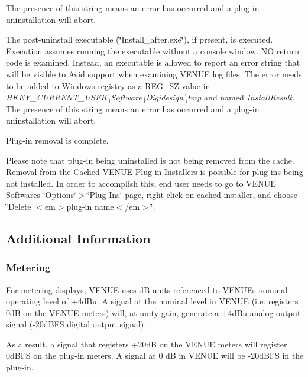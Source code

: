 \begin{DoxyEnumerate}
The presence of this string means an error has occurred and a plug-\/in uninstallation will abort.  
\item The post-\/uninstall executable (\char`\"{}\+Install\+\_\+after.\+exe\char`\"{}), if present, is executed. Execution assumes running the executable without a console window. NO return code is examined. Instead, an executable is allowed to report an error string that will be visible to Avid support when examining V\+E\+N\+UE log files. The error needs to be added to Windows registry as a {\ttfamily R\+E\+G\+\_\+\+SZ} value in {\itshape H\+K\+E\+Y\+\_\+\+C\+U\+R\+R\+E\+N\+T\+\_\+\+U\+S\+ER\textbackslash{}Software\textbackslash{}Digidesign\textbackslash{}tmp} and named {\itshape Install\+Result}. The presence of this string means an error has occurred and a plug-\/in uninstallation will abort.  
\item Plug-\/in removal is complete.  
\end{DoxyEnumerate}

Please note that plug-\/in being uninstalled is not being removed from the cache. Removal from the Cached V\+E\+N\+UE Plug-\/in Installers is possible for plug-\/ins being not installed. In order to accomplish this, end user needs to go to V\+E\+N\+UE Software\textquotesingle{}s \char`\"{}\+Options\char`\"{}$>$\char`\"{}\+Plug-\/\+Ins\char`\"{} page, right click on cached installer, and choose \char`\"{}\+Delete $<$em$>$plug-\/in name$<$/em$>$\char`\"{}.



 \hypertarget{a00849_aax_venue_guide__additional_information}{}\subsection{Additional Information}\label{a00849_aax_venue_guide__additional_information}
 \hypertarget{a00849_subsection__aax_venue_guide__additional_information__metering}{}\subsubsection{Metering}\label{a00849_subsection__aax_venue_guide__additional_information__metering}
 For metering displays, V\+E\+N\+UE uses dB units referenced to V\+E\+N\+UE\textquotesingle{}s nominal operating level of +4d\+Bu. A signal at the nominal level in V\+E\+N\+UE (i.\+e. registers 0dB on the V\+E\+N\+UE meters) will, at unity gain, generate a +4d\+Bu analog output signal (-\/20d\+B\+FS digital output signal).

 As a result, a signal that registers +20dB on the V\+E\+N\+UE meters will register 0d\+B\+FS on the plug-\/in meters. A signal at 0 dB in V\+E\+N\+UE will be -\/20d\+B\+FS in the plug-\/in.

